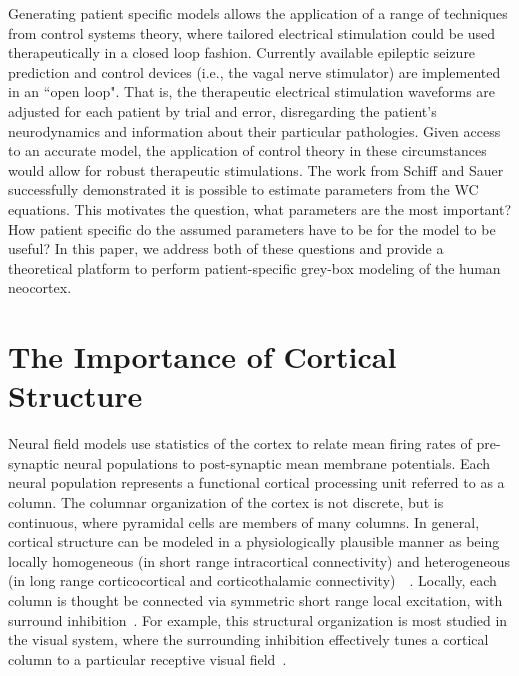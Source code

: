 \documentclass[12pt]{iopart}		%
\begin{document}
Generating patient specific models allows the application of a range of techniques from control systems theory, where tailored electrical stimulation could be used therapeutically in a closed loop fashion.  Currently available epileptic seizure prediction and control devices (i.e., the vagal nerve stimulator) are implemented in an ``open loop".  That is, the therapeutic electrical stimulation waveforms are adjusted for each patient by trial and error, disregarding the patient's neurodynamics and information about their particular pathologies. Given access to an accurate model, the application of control theory in these circumstances would allow for robust therapeutic stimulations.
The work from Schiff and Sauer~\cite{schiff2008kalman} successfully demonstrated  it is possible to estimate parameters from the WC equations. This motivates the question, what parameters are the most important? How patient specific do the assumed parameters have to be for the model to be useful? In this paper, we address both of these questions and provide a theoretical platform to perform patient-specific grey-box modeling of the human neocortex.

\section{The Importance of Cortical Structure}
Neural field models use statistics of the cortex to relate mean firing rates of pre-synaptic neural populations to post-synaptic mean membrane potentials. Each neural population represents a functional cortical processing unit referred to as a column. The columnar organization of the cortex is not discrete, but is continuous, where pyramidal cells are members of many columns. In general, cortical structure can be modeled in a physiologically plausible manner as being locally homogeneous (in short range intracortical connectivity) and heterogeneous (in long range corticocortical and corticothalamic connectivity)~\cite{Jirsa2009}~\cite{Qubbaj2007}. Locally, each column is thought be connected via symmetric short range local excitation, with surround inhibition~\cite{Braitenberg1998}. For example, this structural organization is most studied in the visual system, where the surrounding inhibition effectively tunes a cortical column to a particular receptive visual field~\cite{Sullivan2006}.
\end{document}
